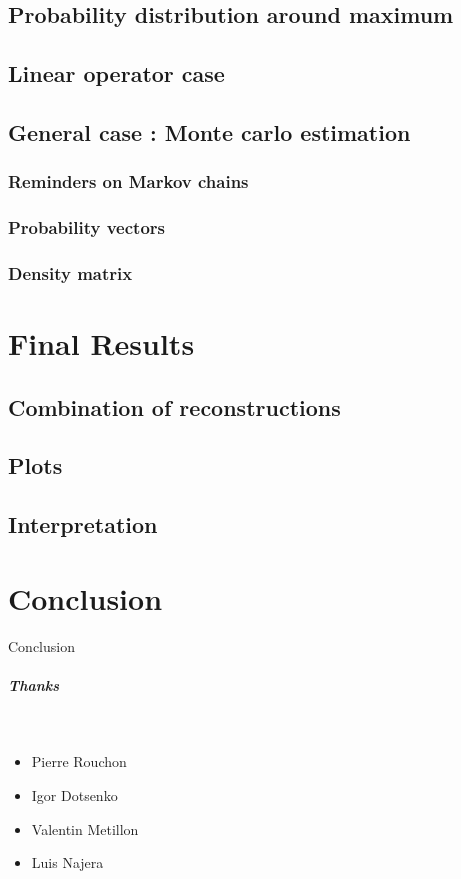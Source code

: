 \documentclass[10pt]{report}
\begin{document}
\section{Probability distribution around maximum}
\section{Linear operator case}
\section{General case : Monte carlo estimation}
\subsection{Reminders on Markov chains}
\subsection{Probability vectors}
\subsection{Density matrix}

\chapter{Final Results}
\section{Combination of reconstructions}
\section{Plots}
\section{Interpretation}


\chapter*{Conclusion} %

Conclusion



\vfill

\paragraph{\Huge Thanks}

\

\vspace{3mm}

\begin{itemize}

\item Pierre Rouchon
\item Igor Dotsenko
\item Valentin Metillon
\item Luis Najera

\end{itemize}

\vfill






{\let\clearpage\relax }
\end{document}
